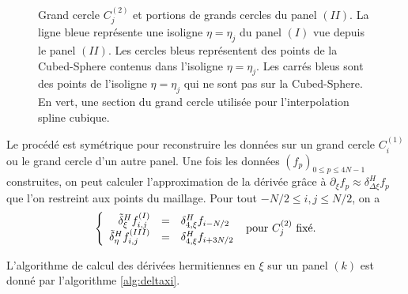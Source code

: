 \begin{figure}[htbp]
\begin{center}
\end{center}
\caption{Grand cercle $C_j^{(2)}$ et portions de grands cercles du panel $(II)$. La ligne bleue représente une isoligne $\eta=\eta_j$ du panel $(I)$ vue depuis le panel $(II)$. Les cercles bleus représentent des points de la Cubed-Sphere contenus dans l'isoligne $\eta=\eta_j$. Les carrés bleus sont des points de l'isoligne $\eta=\eta_j$ qui ne sont pas sur la Cubed-Sphere. En vert, une section du grand cercle utilisée pour l'interpolation spline cubique.}
\label{fig: panel II_interp2}
\end{figure}  

Le procédé est symétrique pour reconstruire les données sur un grand cercle $C_i^{(1)}$ ou le grand cercle d'un autre panel.
Une fois les données $(f_p)_{0 \leq p \leq 4N-1}$ construites, on peut calculer l'approximation de la dérivée grâce à $\partial_{\xi} f_p \approx \delta_{\Delta \xi}^H f_p$
que l'on restreint aux points du maillage. Pour tout $-N/2 \leq i,j \leq N/2$, on a 
\begin{equation}
\left\lbrace
\begin{array}{rcl}
\tilde{\delta}^H_{\xi} f_{i,j}^{(I)} & = & \delta_{4, \xi}^H f_{i-N/2}\\
\tilde{\delta}^H_{\eta} f_{i,j}^{(III)} & = & \delta_{4, \xi}^H f_{i+3N/2}
\end{array}
\right.
\text{ pour } C^{(2)}_j \text{ fixé.}
\end{equation}

L'algorithme de calcul des dérivées hermitiennes en $\xi$ sur un panel $(k)$ est donné par l'algorithme \ref{alg:deltaxi}.

